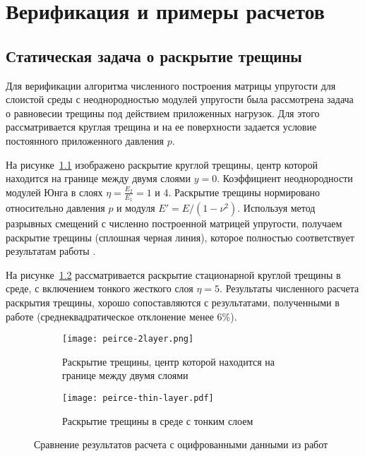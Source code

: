 \chapter{Верификация и примеры расчетов}
\label{sec:verification}

\section{Статическая задача о раскрытие трещины}
\label{sec:static-fracture}
Для верификации алгоритма численного построения матрицы упругости для слоистой среды с неоднородностью модулей упругости была рассмотрена задача о равновесии трещины под действием приложенных нагрузок. Для этого рассматривается круглая трещина и на ее поверхности задается условие постоянного приложенного давления $p$. 

На рисунке~\ref{fig:peirce-2layer} изображено раскрытие круглой трещины, центр которой находится на границе между двумя слоями $y=0$. Коэффициент неоднородности модулей Юнга в слоях $\eta = \frac{E_2}{E_1} = 1$ и 4. Раскрытие трещины нормировано относительно давления $p$ и модуля $E' = E / (1-\nu^2)$. Используя метод разрывных смещений с численно построенной матрицей упругости, получаем раскрытие трещины (сплошная черная линия), которое полностью соответствует результатам работы \cite{Peirce2001UniformAA}.

На рисунке~\ref{fig:peirce-thin-layer} рассматривается раскрытие стационарной круглой трещины в среде, с включением тонкого жесткого слоя $\eta=5$. Результаты численного расчета раскрытия трещины, хорошо сопоставляются с результатами, полученными в работе \cite{Peirce2001TheSF} (среднеквадратическое отклонение менее 6\%).

\begin{figure}[htbp]
    \centering
    \begin{subfigure}[t]{0.4\textwidth}
        \centering
        \texttt{[image: peirce-2layer.png]}
        \caption{Раскрытие трещины, центр которой находится на границе между двумя слоями}
        \label{fig:peirce-2layer}
    \end{subfigure}
    \hfill 
    \begin{subfigure}[t]{0.55\textwidth}
        \centering
        \texttt{[image: peirce-thin-layer.pdf]}
        \caption{Раскрытие трещины в среде с тонким слоем}
        \label{fig:peirce-thin-layer}
    \end{subfigure}
    \caption{Сравнение результатов расчета с оцифрованными данными из работ \cite{Peirce2001UniformAA,Peirce2001TheSF}}
    \label{fig:comparison-peirce}
\end{figure}


